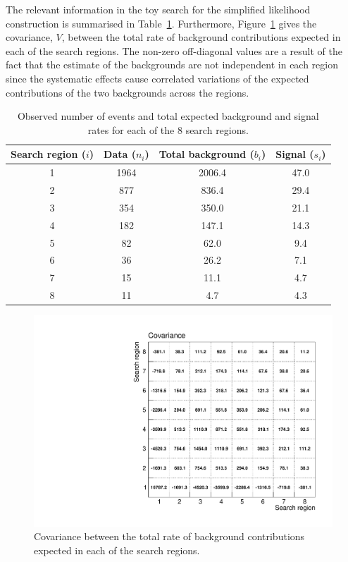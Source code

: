 The relevant information in the toy search for the simplified likelihood construction is summarised in Table~\ref{tab:toytable}.
Furthermore, Figure~\ref{fig:covariance} gives the covariance, $V$, between the total rate of 
background contributions expected in each of the search regions. The non-zero off-diagonal values are a result of the fact that the estimate of the 
backgrounds are not independent in each region since the systematic effects cause correlated variations of the expected contributions of the two backgrounds 
across the regions. 

\begin{table}[!htb]
\caption{Observed number of events and total expected background and signal rates for each of the 8 search regions.}
 \begin{center}
 \begin{tabular}{|c|c|c|c|}
\hline
Search region ($i$) & Data ($n_{i}$) & Total background ($b_{i}$) & Signal ($s_{i}$) \\
\hline
1 & 1964 & 2006.4 & 47.0 \\
2 & 877 & 836.4 & 29.4 \\
3 & 354 & 350.0 & 21.1 \\
4 & 182 & 147.1 & 14.3 \\
5 & 82  & 62.0  & 9.4 \\
6 & 36  & 26.2  & 7.1 \\
7 & 15  & 11.1  & 4.7 \\
8 & 11  & 4.7   & 4.3 \\
\hline
\end{tabular}
\end{center}
\label{tab:toytable}
\end{table}

\begin{figure}[hbt]
  \begin{center} 
   \includegraphics[width=1.8\cmsFigWidth]{figures/htsearch_covariance.pdf}
   \caption{Covariance between the total rate of background  contributions expected  in each of the  search regions.}
   \label{fig:covariance} 
  \end{center}
\end{figure}

